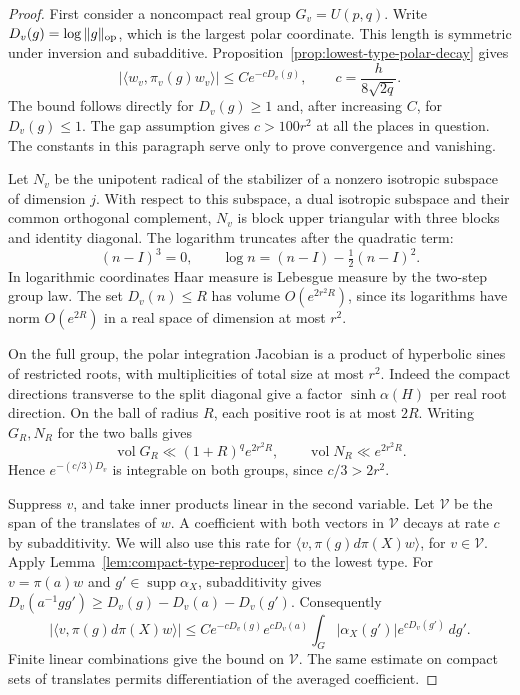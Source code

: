 \begin{proof}

First consider a noncompact real group \(G_v=U(p,q)\).
Write \(D_v(g)=\log\|g\|_{\rm op}\), which is the largest
polar coordinate. This length is symmetric under inversion and
subadditive. Proposition~\ref{prop:lowest-type-polar-decay} gives
\[
   |\langle w_v,\pi_v(g)w_v\rangle|
      \le C e^{-cD_v(g)},\qquad c=\frac{h}{8\sqrt{2q}}.
\]
The bound follows directly for \(D_v(g)\ge1\) and, after increasing
\(C\), for \(D_v(g)\le1\). The gap assumption gives \(c>100r^2\)
at all the places in question. The constants in this paragraph
serve only to prove convergence and vanishing.

Let \(N_v\) be the unipotent radical of the stabilizer of a nonzero
isotropic subspace of dimension \(j\). With respect to this
subspace, a dual isotropic subspace and their common orthogonal
complement, \(N_v\) is block upper triangular with three blocks
and identity diagonal. The logarithm truncates after the quadratic term:
\[
             (n-I)^3=0,\qquad \log n=(n-I)-\tfrac12(n-I)^2 .
\] In logarithmic coordinates Haar
measure is Lebesgue measure by the two-step group law. The
set \(D_v(n)\le R\) has volume \(O(e^{2r^2R})\), since its
logarithms have norm \(O(e^{2R})\) in a real space of dimension at
most \(r^2\).

On the full group, the polar integration Jacobian
is a product of hyperbolic sines of restricted roots, with
multiplicities of total size at most \(r^2\). Indeed the compact
directions transverse to the split diagonal give a factor
\(\sinh\alpha(H)\) per real root direction. On the ball of radius \(R\), each positive root is at most \(2R\).
Writing \(G_R,N_R\) for the two balls gives
\[
  \operatorname{vol}G_R\ll (1+R)^q e^{2r^2R},\qquad
  \operatorname{vol}N_R\ll e^{2r^2R}.
\]
Hence \(e^{-(c/3)D_v}\) is integrable on both groups, since
\(c/3>2r^2\).

Suppress \(v\), and take inner products linear in the second
variable. Let \(\mathcal V\) be the span of the translates of
\(w\). A coefficient with both vectors in \(\mathcal V\) decays
at rate \(c\) by subadditivity. We will also use this rate for
\(\langle v,\pi(g)d\pi(X)w\rangle\), for \(v\in\mathcal V\).
Apply Lemma~\ref{lem:compact-type-reproducer} to the lowest type.
For \(v=\pi(a)w\) and \(g'\in\operatorname{supp}\alpha_X\),
subadditivity gives \(D_v(a^{-1}gg')\ge D_v(g)-D_v(a)-D_v(g')\).
Consequently
\[
 |\langle v,\pi(g)d\pi(X)w\rangle|
 \le C e^{-cD_v(g)} e^{cD_v(a)}
          \int_G |\alpha_X(g')|e^{cD_v(g')}\,dg' .
\]
Finite linear combinations give the bound on \(\mathcal V\).
The same estimate on compact sets of translates permits
differentiation of the averaged coefficient.


\end{proof}

